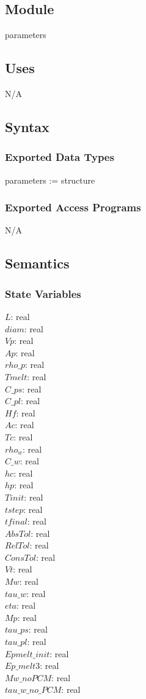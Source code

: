 \documentclass[12pt]{article}
\begin{document}
\subsection{Module}
parameters
\subsection{Uses}
N/A
\subsection{Syntax}
\subsubsection{Exported Data Types}
parameters := structure
\subsubsection{Exported Access Programs}
N/A
\subsection{Semantics}
\subsubsection{State Variables}
$L$: real \\
$diam$: real \\
$Vp$: real \\
$Ap$: real \\
$rho\_p$: real \\
$Tmelt$: real \\
$C\_ps$: real \\
$C\_pl$: real \\
$Hf$: real \\
$Ac$: real \\
$Tc$: real \\
$rho_w$: real \\
$C\_w$: real \\
$hc$: real \\
$hp$: real \\
$Tinit$: real \\
$tstep$: real \\
$tfinal$: real \\
$AbsTol$: real \\
$RelTol$: real \\
$ConsTol$: real \\
$Vt$: real \\
$Mw$: real \\
$tau\_w$: real \\
$eta$: real \\
$Mp$: real \\
$tau\_ps$: real \\
$tau\_pl$: real \\
$Epmelt\_init$: real \\
$Ep\_melt3$: real \\ 
$Mw\_noPCM$: real \\
$tau\_w\_no\_PCM$: real
\end{document}
